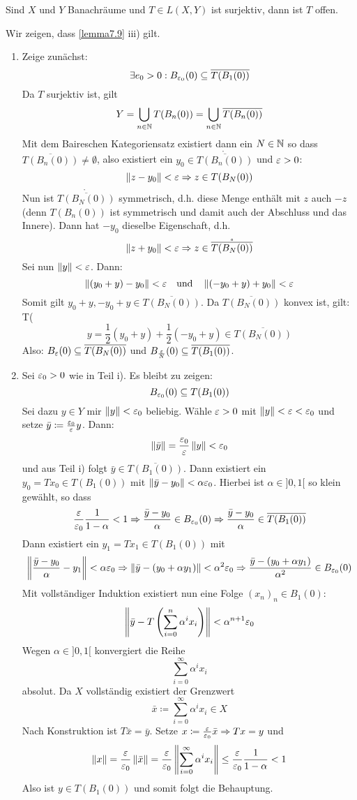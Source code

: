 \begin{theorem}
	Sind $ X $ und $ Y $ Banachr\"aume und $ T\in L(X,Y) $ ist surjektiv, dann ist $ T $ offen.
\end{theorem}
\begin{beweis}
	Wir zeigen, dass \ref{lemma7.9} iii) gilt.
	\begin{enumerate}
		\item Zeige zun\"achst:
		\[ \exists e_0>0:B_{\varepsilon_0}(0)\subseteq\overline{T(B_1(0))} \]
		Da $ T $ surjektiv ist, gilt
		\[ Y=\bigcup_{n\in\mathbb{N}} T(B_n(0))=\bigcup_{n\in\mathbb{N}}\overline{T(B_n(0))} \]
		Mit dem Baireschen Kategoriensatz existiert dann ein $ N\in\mathbb{N} $ so dass $ \overline{T(B_n(0))}\neq\emptyset $, also existiert ein $ y_0\in\mathring{\overline{T(B_n(0))}} $ und $ \varepsilon>0 $:
		\[ \left\|z-y_0\right\|<\varepsilon\Rightarrow z\in T(B_N(0)) \]
		Nun ist $ \mathring{\overline{T(B_N(0))}} $ symmetrisch, d.h. diese Menge enth\"alt mit $ z $ auch $ -z $ (denn $ T(B_n(0)) $ ist symmetrisch und damit auch der Abschluss und das Innere). Dann hat $ -y_0 $ dieselbe Eigenschaft, d.h.
		\[ \left\|z+y_0\right\|<\varepsilon\Rightarrow z\in\mathring{\overline{T(B_N(0))}} \]
		Sei nun $ \left\|y\right\|<\varepsilon $. Dann:
		\[ \left\|(y_0+y)-y_0\right\|<\varepsilon\quad\text{und}\quad\left\|(-y_0+y)+y_0\right\|<\varepsilon \]
		Somit gilt $ y_0+y, -y_0+y\in\overline{T(B_N(0))} $. Da $ \overline{T(B_N(0))} $ konvex ist, gilt:
		T(\[ y=\frac{1}{2}(y_0+y)+\frac{1}{2}(-y_0+y)\in\overline{T(B_N(0))} \]
		Also: $ B_\varepsilon(0)\subseteq\overline{T(B_N(0))} $ und $ B_{\frac{\varepsilon}{N}}(0)\subseteq\overline{T(B_1(0))} $.
		\item Sei $ \varepsilon_0>0 $ wie in Teil i). Es bleibt zu zeigen:
		\[ B_{\varepsilon_0}(0)\subseteq T(B_1(0)) \]
		Sei dazu $ y\in Y $ mir $ \left\|y\right\|<\varepsilon_0 $ beliebig. W\"ahle $ \varepsilon>0 $ mit $ \left\|y\right\|<\varepsilon<\varepsilon_0 $ und setze $ \bar y\coloneqq\frac{\varepsilon_0}{\varepsilon}y $. Dann:
		\[ \left\|\bar y\right\|=\frac{\varepsilon_0}{\varepsilon}\left\|y\right\|<\varepsilon_0 \]
		und aus Teil i) folgt $ \bar y\in\overline{T(B_1(0))} $. Dann existiert ein $ y_0=Tx_0\in T(B_1(0)) $ mit $ \left\|\bar y-y_0\right\|<\alpha\varepsilon_0 $. Hierbei ist $ \alpha\in]0,1[ $ so klein gew\"ahlt, so dass
		\[ \frac{\varepsilon}{\varepsilon_0}\frac{1}{1-\alpha}<1\Rightarrow\frac{\bar y-y_0}{\alpha}\in B_{\varepsilon_0}(0)\Rightarrow\frac{\bar y-y_0}{\alpha}\in\overline{T(B_1(0))} \]
		Dann existiert ein $ y_1=Tx_1\in T(B_1(0)) $ mit 
		\[ \left\|\frac{\bar y-y_0}{\alpha}-y_1\right\|<\alpha\varepsilon_0\Rightarrow\left\|\bar y-(y_0+\alpha y_1)\right\|<\alpha^2\varepsilon_0\Rightarrow\frac{\bar y-(y_0+\alpha y_1)}{\alpha^2}\in B_{\varepsilon_0}(0) \]
		Mit vollst\"andiger Induktion existiert nun eine Folge $ (x_n)_n\in B_1(0) $:
		\[ \left\|\bar y-T\left(\sum_{i=0}^{n}\alpha^ix_i\right)\right\|<\alpha^{n+1}\varepsilon_0 \]
		Wegen $ \alpha\in]0,1[ $ konvergiert die Reihe
		\[ \sum_{i=0}^\infty \alpha^i x_i \]
		absolut. Da $ X $ vollst\"andig existiert der Grenzwert
		\[ \bar x\coloneqq\sum_{i=0}^{\infty}\alpha^ix_i\in X \]
		Nach Konstruktion ist $ T\bar x=\bar y $. Setze $ x\coloneqq\frac{\varepsilon}{\varepsilon_0}\bar x\Rightarrow Tx=y $ und \[ \left\|x\right\|=\frac{\varepsilon}{\varepsilon_0}\left\|\bar x\right\|=\frac{\varepsilon}{\varepsilon_0}\left\|\sum_{i=0}^{\infty}\alpha^ix_i\right\|\leq\frac{\varepsilon}{\varepsilon_0}\frac{1}{1-\alpha}<1 \]
		Also ist $ y\in T(B_1(0)) $ und somit folgt die Behauptung.
	\end{enumerate}
\end{beweis}
